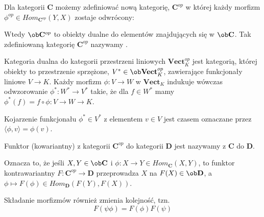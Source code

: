 \begin{definition}
  Dla kategorii $\mathbf{C}$ możemy zdefiniować nową kategorię, $\mathbf{C}^{op}$ w której każdy morfizm $\phi^{op}\in Hom_{\mathbf{C}^{op}}(Y, X)$ zostaje odwrócony:
  \begin{center}\end{center}
  Wtedy $\ob\mathbf{C}^{op}$ to obiekty dualne do elementów znajdujących się w $\ob\mathbf{C}$. Tak zdefiniowaną kategorię $\mathbf{C}^{op}$ nazywamy .
\end{definition}

\begin{example}
\item Kategoria dualna do kategorii przestrzeni liniowych $\mathbf{Vect}_K^{op}$ jest kategorią, której obiekty to przestrzenie sprzężone, $V^*\in\ob\mathbf{Vect}^{op}_K$, zawierające funkcjonały liniowe $V\to K$. Każdy morfizm $\phi:V\to W$ w $\mathbf{Vect}_K$ indukuje wówczas odwzorowanie $\phi^*:W^*\to V^*$ takie, że dla $f\in W^*$ mamy $\phi^*(f)=f\circ\phi:V\to W\to K$.

  Kojarzenie funkcjonału $\phi^*\in V^*$ z elementem $v\in V$ jest czasem oznaczane przez $\langle \phi, v\rangle=\phi(v)$.
\end{example}

\begin{definition}
  Funktor (kowariantny) z kategorii $\mathbf{C}^{op}$ do kategorii $\mathbf{D}$ jest nazywamy  z $\mathbf{C}$ do $\mathbf{D}$.
\end{definition}

Oznacza to, że jeśli $X,Y\in\ob\mathbf{C}$ i $\phi:X\to Y\in Hom_{\mathbf{C}}(X, Y)$, to funktor kontrawariantny $F:\mathbf{C}^{op}\to\mathbf{D}$ przeprowadza $X$ na $F(X)\in\ob\mathbf{D}$, a $\phi\mapsto F(\phi)\in Hom_{\mathbf{D}}(F(Y),F(X))$.
\begin{center}\end{center}
Składanie morfizmów również zmienia kolejność, tzn.
$$F(\psi\phi)=F(\phi)F(\psi)$$









